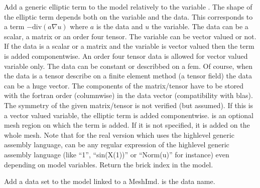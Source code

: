 \documentclass[a4paper,11pt,english]{sphinxmanual}
\begin{document}
\begin{fulllineitems}
\begin{fulllineitems}
\label{\detokenize{python/cmdref_Model:getfem.Model.add_generic_elliptic_brick}}
Add a generic elliptic term to the model relatively to the variable .
The shape of the elliptic term depends both on the variable and the data.
This corresponds to a term
\(-\text{div}(a\nabla u)\)
where \(a\) is the data and \(u\) the variable. The data can be
a scalar,
a matrix or an order four tensor. The variable can be vector valued or
not. If the data is a scalar or a matrix and the variable is vector
valued then the term is added componentwise. An order four tensor data
is allowed for vector valued variable only. The data can be constant or
describbed on a fem. Of course, when the data is a tensor describe on a
finite element method (a tensor field) the data can be a huge vector.
The components of the matrix/tensor have to be stored with the fortran
order (columnwise) in the data vector (compatibility with blas). The
symmetry of the given matrix/tensor is not verified (but assumed). If
this is a vector valued variable, the elliptic term is added
componentwise.  is an optional mesh region on which the term is
added. If it is not specified, it is added on the whole mesh. Note that
for the real
version which uses the high\sphinxhyphen{}level generic assembly language, 
can be any regular expression of the high\sphinxhyphen{}level generic assembly
language (like “1”, “sin(X(1))” or “Norm(u)” for instance) even
depending on model variables. Return the
brick index in the model.

\end{fulllineitems}


\begin{fulllineitems}
\label{\detokenize{python/cmdref_Model:getfem.Model.add_im_data}}
Add a data set to the model linked to a MeshImd.  is the data
name.

\end{fulllineitems}


\end{fulllineitems}
\end{document}
